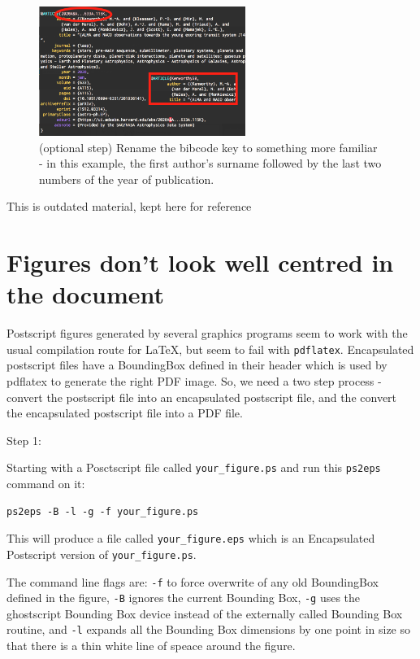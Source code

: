 \documentclass[a4,modern]{aastex63}
\begin{document}
\begin{figure}[htp]
\centering
\includegraphics[angle=0,width=0.6\textwidth]{04_key}
\caption{ \label{04keyrename} (optional step) Rename the bibcode key to something more familiar - in this example, the first author's surname followed by the last two numbers of the year of publication.}
\end{figure}

\begin{tcolorbox}[colback=red!5!white,colframe=red!75!black,title=CAUTION]

This is outdated material, kept here for reference

\end{tcolorbox}

\section{Figures don't look well centred in the document}


Postscript figures generated by several graphics programs seem to work with the usual compilation route for \LaTeX, but seem to fail with \verb=pdflatex=.
%
Encapsulated postscript files have a BoundingBox defined in their header which is used by pdflatex to generate the right PDF image.
%
So, we need a two step process - convert the postscript file into an encapsulated postscript file, and the convert the encapsulated postscript file into a PDF file.

Step 1:

Starting with a Posctscript file called \verb=your_figure.ps= and run this \verb=ps2eps= command on it:

\begin{verbatim}
ps2eps -B -l -g -f your_figure.ps
\end{verbatim}

This will produce a file called \verb=your_figure.eps= which is an Encapsulated Postscript version of \verb=your_figure.ps=.

The command line flags are: \verb=-f= to force overwrite of any old BoundingBox defined in the figure, \verb=-B= ignores the current Bounding Box, \verb=-g= uses the ghostscript Bounding Box device instead of the externally called Bounding Box routine, and \verb=-l= expands all the Bounding Box dimensions by one point in size so that there is a thin white line of speace around the figure.
\end{document}
